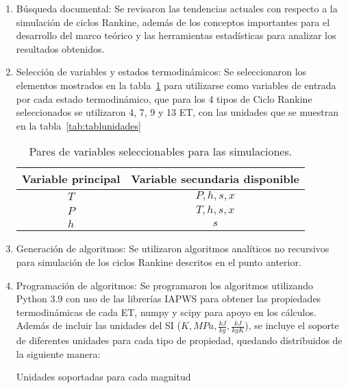 \begin{enumerate}
    \item Búsqueda documental: Se revisaron las tendencias actuales con respecto a la simulación de ciclos Rankine, además de los conceptos importantes para el desarrollo del marco teórico y las herramientas estadísticas para analizar los resultados obtenidos.
    \item Selección de variables y estados termodinámicos: Se seleccionaron los elementos mostrados en la tabla~\ref{tab:tabpares} para utilizarse como variables de entrada por cada estado termodinámico, que para los 4 tipos de Ciclo Rankine seleccionados se utilizaron 4, 7, 9 y 13 ET, con las unidades que se muestran en la tabla~\ref{tab:tablunidades}

\begin{table}[H]
    \centering
    \caption{Pares de variables seleccionables para las simulaciones.}
    \label{tab:tabpares}

    \begin{tabular}{cc}
        \hline
        Variable principal & Variable secundaria disponible \\
        \hline
        $T$ & $P,h,s,x$ \\
        $P$ & $T,h,s,x$ \\
        $h$ & $s$ \\
        \hline
    \end{tabular}
\end{table}

    \item Generación de algoritmos: Se utilizaron algoritmos analíticos no recursivos para simulación de los ciclos Rankine descritos en el punto anterior.
    \item Programación de algoritmos: Se programaron los algoritmos utilizando Python 3.9 con uso de las librerías IAPWS para obtener las propiedades termodinámicas de cada ET, numpy y scipy para apoyo en los cálculos. Además de incluir las unidades del SI ($K,MPa, \frac{kJ}{kg},\frac{kJ}{kg K}$), se incluye el soporte de diferentes unidades para cada tipo de propiedad, quedando distribuidos de la siguiente manera:

\begin{table}[H]
    \centering
    \caption{Unidades soportadas para cada magnitud}
    \label{tab:tablunidades}


\end{table}
\end{enumerate}
